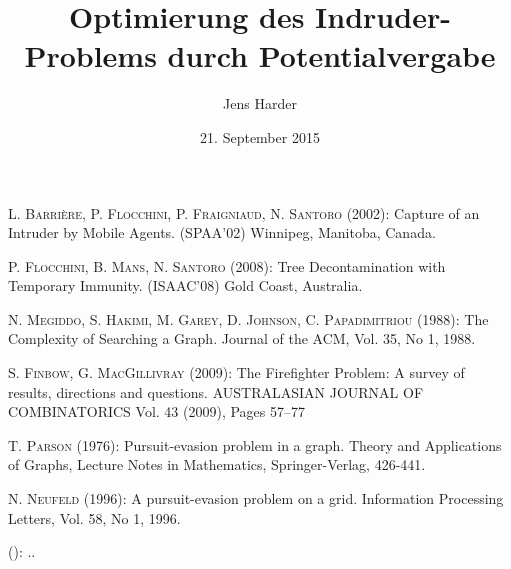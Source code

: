 \documentclass[12pt, a4paper, german]{article}
\author{Jens Harder}
\date{21. September 2015}
\title{Optimierung des Indruder-Problems durch Potentialvergabe}
\begin{document}
	\maketitle
	\newpage
	\pagestyle{empty}
	

	\pagestyle{plain}
	\doublespacing
	\tableofcontents
	
	\newpage
	
	
	
	
	

	
	
	
	
	
	
	\newpage

	\renewcommand{\refname}{Literaturquellen}
	
	\begin{thebibliography}{99}
		
		
		 \textsc{L. Barrière, P. Flocchini, P. Fraigniaud, N. Santoro} (2002): Capture of an Intruder by Mobile Agents. (SPAA'02) Winnipeg, Manitoba, Canada.

		 \textsc{P. Flocchini, B. Mans, N. Santoro} (2008): Tree Decontamination with Temporary Immunity. (ISAAC'08) Gold Coast, Australia.
		
		 \textsc{N. Megiddo, S. Hakimi, M. Garey, D. Johnson, C. Papadimitriou} (1988): The Complexity of Searching a Graph. Journal of the ACM, Vol. 35, No 1, 1988.
		
		 \textsc{S. Finbow, G. MacGillivray} (2009): The Firefighter Problem: A survey of results, directions and questions.
		AUSTRALASIAN JOURNAL OF COMBINATORICS Vol. 43 (2009), Pages 57–77
		
		 \textsc{T. Parson} (1976): Pursuit-evasion problem in a graph. Theory and Applications of Graphs, Lecture Notes in Mathematics, Springer-Verlag, 426-441.
		
		 \textsc{N. Neufeld} (1996): A pursuit-evasion problem on a grid. Information Processing Letters, Vol. 58, No 1, 1996.
		
		 \textsc{} (): ..


		
	\end{thebibliography} 
	
	
\end{document}
